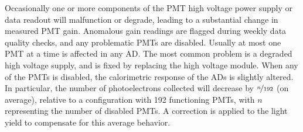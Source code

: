 Occasionally one or more components of the PMT high voltage power supply
or data readout will malfunction or degrade,
leading to a substantial change in measured PMT gain.
Anomalous gain readings are flagged during weekly data quality checks,
and any problematic PMTs are disabled.
Usually at most one PMT at a time is affected in any AD.
The most common problem is a degraded high voltage supply,
and is fixed by replacing the high voltage module.
When any of the PMTs is disabled, the calorimetric response of the ADs
is slightly altered.
In particular, the number of photoelectrons collected
will decrease by $\nicefrac{n}{192}$ (on average),
relative to a configuration with \num{192} functioning PMTs,
with $n$ representing the number of disabled PMTs.
A correction is applied to the light yield to compensate for this average behavior.



